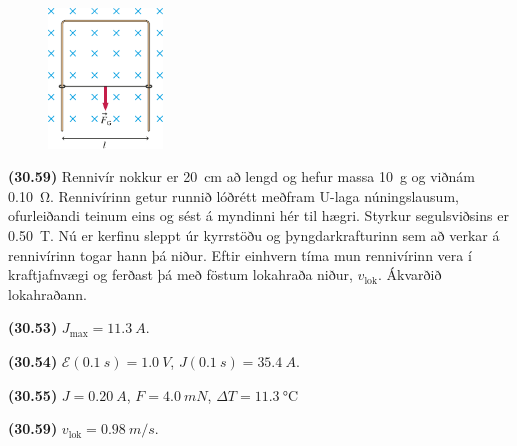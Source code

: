 \ifdefined \wholebook \else\documentclass[oneside]{book}\usepackage{EdlBook}\graphicspath{{figures/}}
\begin{document}
\begin{enumerate}[label = \textbf{(\alph*)}]
\begin{minipage}{\linewidth}
\end{minipage}

\vspace{0.3cm}



\begin{minipage}{\linewidth}
\begin{figure}
\vspace{-1.25cm}
\includegraphics[width = 1.2in]{figures/rk3059.pdf}
\end{figure}

\item[\textbf{(30.59)}] Rennivír nokkur er \SI{20}{cm} að lengd og hefur massa \SI{10}{g} og viðnám \SI{0.10}{\ohm}. Rennivírinn getur runnið lóðrétt meðfram U-laga núningslausum, ofurleiðandi teinum eins og sést á myndinni hér til hægri. Styrkur segulsviðsins er \SI{0.50}{T}. Nú er kerfinu sleppt úr kyrrstöðu og þyngdarkrafturinn sem að verkar á rennivírinn togar hann þá niður. Eftir einhvern tíma mun rennivírinn vera í kraftjafnvægi og ferðast þá með föstum lokahraða niður, $v_{\text{lok}}$. Ákvarðið lokahraðann.

\end{minipage}

\end{enumerate}

\vspace{1cm}

\begin{tcolorbox}
\begin{enumerate*}[label = ]
  \item \textbf{(30.53)} $J_{\text{max}} = \SI{11.3}{A}$.
  \item \textbf{(30.54)} $\mathcal{E}(\SI{0.1}{s}) = \SI{1.0}{V}$, $J(\SI{0.1}{s}) = \SI{35.4}{A}$.
  \item \textbf{(30.55)} $J = \SI{0.20}{A}$, $F = \SI{4.0}{mN}$, $\Delta T = \SI{11.3}{\celsius}$
  \item \textbf{(30.59)} $v_{\text{lok}} = \SI{0.98}{m/s}$.
\end{enumerate*}
\end{tcolorbox}
\end{document}
